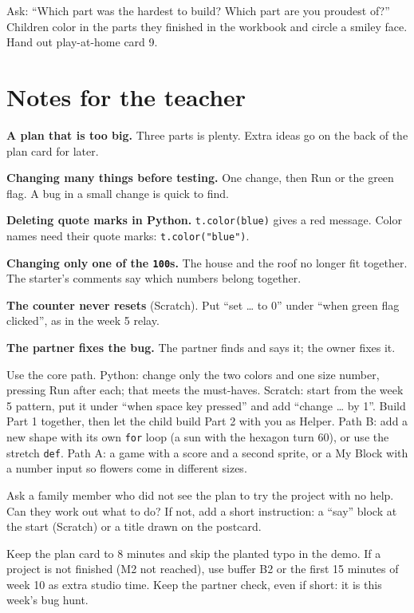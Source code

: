 \begin{reflection}
Ask: \enquote{Which part was the hardest to build? Which part are you proudest of?} Children color in the parts they finished in the workbook and circle a smiley face. Hand out play-at-home card 9.
\end{reflection}

\section{Notes for the teacher}
\begin{commonmistakes}
  \item \textbf{A plan that is too big.} Three parts is plenty. Extra ideas go on the back of the plan card for later.
  \item \textbf{Changing many things before testing.} One change, then Run or the green flag. A bug in a small change is quick to find.
  \item \textbf{Deleting quote marks in Python.} \texttt{t.color(blue)} gives a red message. Color names need their quote marks: \texttt{t.color("blue")}.
  \item \textbf{Changing only one of the \texttt{100}s.} The house and the roof no longer fit together. The starter's comments say which numbers belong together.
  \item \textbf{The counter never resets} (Scratch). Put \enquote{set \ldots{} to 0} under \enquote{when green flag clicked}, as in the week 5 relay.
  \item \textbf{The partner fixes the bug.} The partner finds and says it; the owner fixes it.
\end{commonmistakes}

\begin{differentiation}
\supportpath Use the core path. Python: change only the two colors and one size number, pressing Run after each; that meets the must-haves. Scratch: start from the week 5 pattern, put it under \enquote{when space key pressed} and add \enquote{change \ldots{} by 1}. Build Part 1 together, then let the child build Part 2 with you as Helper.
\extensionpath Path B: add a new shape with its own \texttt{for} loop (a sun with the hexagon turn 60), or use the stretch \texttt{def}. Path A: a game with a score and a second sprite, or a My Block with a number input so flowers come in different sizes.
\end{differentiation}

\begin{stretchchallenge}
Ask a family member who did not see the plan to try the project with no help. Can they work out what to do? If not, add a short instruction: a \enquote{say} block at the start (Scratch) or a title drawn on the postcard.
\end{stretchchallenge}

\begin{teachernote}
Keep the plan card to 8 minutes and skip the planted typo in the demo. If a project is not finished (M2 not reached), use buffer B2 or the first 15 minutes of week 10 as extra studio time. Keep the partner check, even if short: it is this week's bug hunt.
\end{teachernote}

